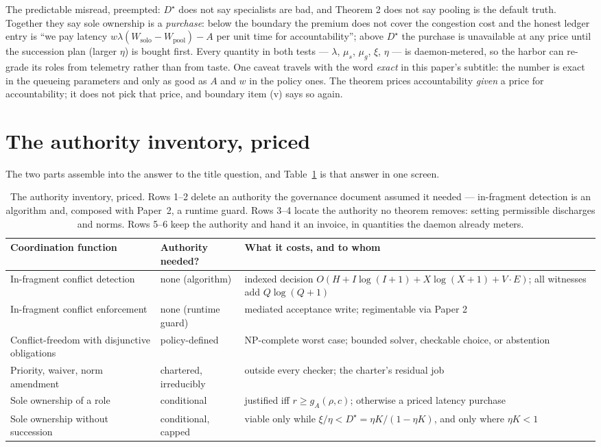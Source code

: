 \documentclass[11pt,a4paper]{article}
\begin{document}
The predictable misread, preempted: $D^\star$ does not say specialists are bad, and Theorem 2 does not say pooling is the
default truth. Together they say sole ownership is a \emph{purchase}: below the boundary the premium does not cover the
congestion cost and the honest ledger entry is ``we pay latency $w\lambda(W_{\mathrm{solo}}-W_{\mathrm{pool}})-A$ per unit time
for accountability''; above $D^\star$ the purchase is unavailable at any price until the succession plan (larger $\eta$) is
bought first. Every quantity in both tests --- $\lambda$, $\mu_s$, $\mu_g$, $\xi$, $\eta$ --- is daemon-metered, so the harbor
can re-grade its roles from telemetry rather than from taste. One caveat travels with the word \emph{exact} in this paper's
subtitle: the number is exact in the queueing parameters and only as good as $A$ and $w$ in the policy ones. The theorem prices
accountability \emph{given} a price for accountability; it does not pick that price, and boundary item (v) says so again.

\section{The authority inventory, priced}\label{sec:inventory}
The two parts assemble into the answer to the title question, and Table~\ref{tab:inventory} is that answer in one screen.

\begin{table}[t]\centering
\caption{The authority inventory, priced. Rows 1--2 delete an authority the governance document assumed it needed --- in-fragment
detection is an algorithm and, composed with Paper~2, a runtime guard. Rows 3--4 locate the authority no theorem removes:
setting permissible discharges and norms. Rows 5--6 keep the authority and hand it an invoice, in quantities the daemon
already meters.}
\label{tab:inventory}
\begin{tabular}{@{}p{}p{}p{}@{}}
\toprule
Coordination function & Authority needed? & What it costs, and to whom \\
\midrule
In-fragment conflict detection & none (algorithm) & indexed decision $O(H+I\log(I+1)+X\log(X+1)+V\!\cdot\!E)$; all witnesses add $Q\log(Q+1)$ \\
In-fragment conflict enforcement & none (runtime guard) & mediated acceptance write; regimentable via Paper 2 \\
Conflict-freedom with disjunctive obligations & policy-defined & NP-complete worst case; bounded solver, checkable choice, or abstention \\
Priority, waiver, norm amendment & chartered, irreducibly & outside every checker; the charter's residual job \\
Sole ownership of a role & conditional & justified iff $r \ge g_A(\rho,c)$; otherwise a priced latency purchase \\
Sole ownership without succession & conditional, capped & viable only while $\xi/\eta < D^\star = \eta K/(1-\eta K)$, and only
where $\eta K<1$ \\
\bottomrule
\end{tabular}
\end{table}
\end{document}
